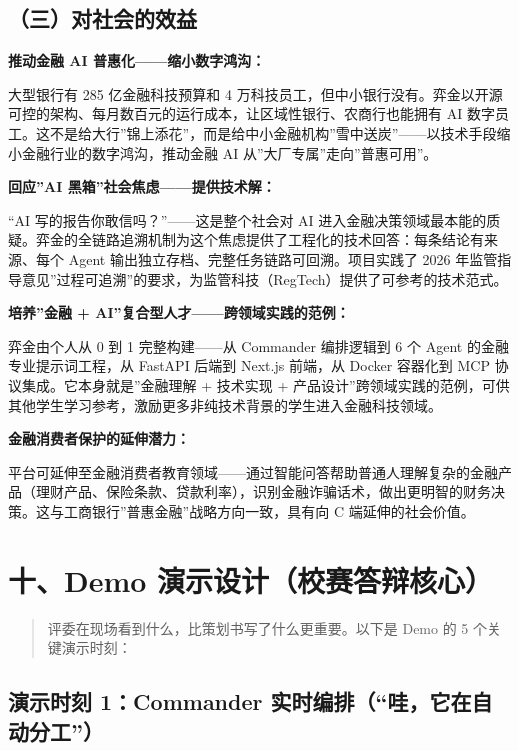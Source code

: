 \documentclass[
]{ctexart}
\begin{document}
\subsection{（三）对社会的效益}\label{ux4e09ux5bf9ux793eux4f1aux7684ux6548ux76ca}

\textbf{推动金融 AI 普惠化------缩小数字鸿沟：}

大型银行有 285 亿金融科技预算和 4
万科技员工，但中小银行没有。弈金以开源可控的架构、每月数百元的运行成本，让区域性银行、农商行也能拥有
AI
数字员工。这不是给大行''锦上添花''，而是给中小金融机构''雪中送炭''------以技术手段缩小金融行业的数字鸿沟，推动金融
AI 从''大厂专属''走向''普惠可用''。

\textbf{回应''AI 黑箱''社会焦虑------提供技术解：}

``AI 写的报告你敢信吗？''------这是整个社会对 AI
进入金融决策领域最本能的质疑。弈金的全链路追溯机制为这个焦虑提供了工程化的技术回答：每条结论有来源、每个
Agent 输出独立存档、完整任务链路可回溯。项目实践了 2026
年监管指导意见''过程可追溯''的要求，为监管科技（RegTech）提供了可参考的技术范式。

\textbf{培养''金融 + AI''复合型人才------跨领域实践的范例：}

弈金由个人从 0 到 1 完整构建------从 Commander 编排逻辑到 6 个 Agent
的金融专业提示词工程，从 FastAPI 后端到 Next.js 前端，从 Docker 容器化到
MCP 协议集成。它本身就是''金融理解 + 技术实现 +
产品设计''跨领域实践的范例，可供其他学生学习参考，激励更多非纯技术背景的学生进入金融科技领域。

\textbf{金融消费者保护的延伸潜力：}

平台可延伸至金融消费者教育领域------通过智能问答帮助普通人理解复杂的金融产品（理财产品、保险条款、贷款利率），识别金融诈骗话术，做出更明智的财务决策。这与工商银行''普惠金融''战略方向一致，具有向
C 端延伸的社会价值。

\section{十、Demo
演示设计（校赛答辩核心）}\label{ux5341demo-ux6f14ux793aux8bbeux8ba1ux6821ux8d5bux7b54ux8fa9ux6838ux5fc3}

\begin{quote}
评委在现场看到什么，比策划书写了什么更重要。以下是 Demo 的 5
个关键演示时刻：
\end{quote}

\subsection{演示时刻 1：Commander
实时编排（``哇，它在自动分工''）}\label{ux6f14ux793aux65f6ux523b-1commander-ux5b9eux65f6ux7f16ux6392ux54c7ux5b83ux5728ux81eaux52a8ux5206ux5de5}
\end{document}

